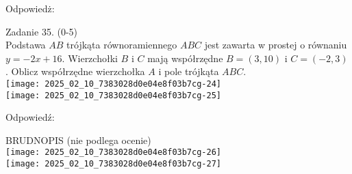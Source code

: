 \documentclass[10pt]{article}
\begin{document}
Odpowiedż:

Zadanie 35. (0-5)\\
Podstawa \(A B\) trójkąta równoramiennego \(A B C\) jest zawarta w prostej o równaniu \(y=-2 x+16\). Wierzchołki \(B\) i \(C\) mają współrzędne \(B=(3,10)\) i \(C=(-2,3)\). Oblicz współrzędne wierzchołka \(A\) i pole trójkąta \(A B C\).\\
\texttt{[image: 2025\_02\_10\_7383028d0e04e8f03b7cg-24]}\\
\texttt{[image: 2025\_02\_10\_7383028d0e04e8f03b7cg-25]}

Odpowiedź:

BRUDNOPIS (nie podlega ocenie)\\
\texttt{[image: 2025\_02\_10\_7383028d0e04e8f03b7cg-26]}\\
\texttt{[image: 2025\_02\_10\_7383028d0e04e8f03b7cg-27]}
\end{document}
